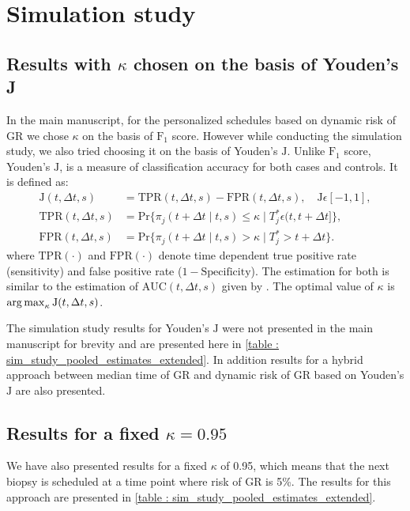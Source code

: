 \section{Simulation study}

\subsection{Results with $\kappa$ chosen on the basis of Youden's J}
In the main manuscript, for the personalized schedules based on dynamic risk of GR we chose $\kappa$ on the basis of $\mbox{F}_1$ score. However while conducting the simulation study, we also tried choosing it on the basis of Youden's $\mbox{J}$. Unlike $\mbox{F}_1$ score, Youden's $\mbox{J}$, is a measure of classification accuracy for both cases and controls. It is defined as:
\begin{align*}
\mbox{J}(t, \Delta t, s) &= \text{TPR}(t, \Delta t, s) - \text{FPR}(t, \Delta t, s), \quad \mbox{J}\epsilon [-1,1],\\
\text{TPR}(t, \Delta t, s) &= \mbox{Pr}\big\{\pi_j(t + \Delta t \mid t,s) \leq \kappa \mid T^*_j \epsilon (t, t + \Delta t]\big\},\\
\text{FPR}(t, \Delta t, s) &= \mbox{Pr}\big\{\pi_j(t + \Delta t \mid t,s) > \kappa \mid T^*_j > t + \Delta t \big\}.
\end{align*}
where $\mbox{TPR}(\cdot)$ and $\mbox{FPR}(\cdot)$ denote time dependent true positive rate (sensitivity) and false positive rate ($1 - \mbox{Specificity}$). The estimation for both is similar to the estimation of $\mbox{AUC}(t, \Delta t, s)$ given by \citet{landmarking2017}. The optimal value of $\kappa$ is $\operatorname{arg\,max}_{\kappa} \mbox{J}(t, \Delta t, s)$.

The simulation study results for Youden's $\mbox{J}$ were not presented in the main manuscript for brevity and are presented here in \ref{table : sim_study_pooled_estimates_extended}. In addition results for a hybrid approach between median time of GR and dynamic risk of GR based on Youden's $\mbox{J}$ are also presented. 

\subsection{Results for a fixed $\kappa = 0.95$}
We have also presented results for a fixed $\kappa$ of 0.95, which means that the next biopsy is scheduled at a time point where risk of GR is 5\%. The results for this approach are presented in \ref{table : sim_study_pooled_estimates_extended}.

